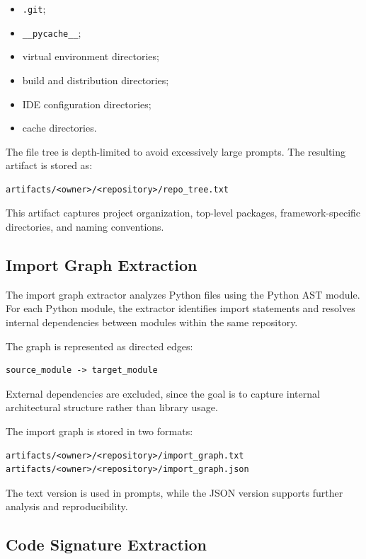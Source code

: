 \begin{itemize}
    \item \texttt{.git};
    \item \texttt{\_\_pycache\_\_};
    \item virtual environment directories;
    \item build and distribution directories;
    \item IDE configuration directories;
    \item cache directories.
\end{itemize}

The file tree is depth-limited to avoid excessively large prompts. The resulting artifact is stored as:

\begin{verbatim}
artifacts/<owner>/<repository>/repo_tree.txt
\end{verbatim}

This artifact captures project organization, top-level packages, framework-specific directories, and naming conventions.

\subsection{Import Graph Extraction}

The import graph extractor analyzes Python files using the Python AST module. For each Python module, the extractor identifies import statements and resolves internal dependencies between modules within the same repository.

The graph is represented as directed edges:

\begin{verbatim}
source_module -> target_module
\end{verbatim}

External dependencies are excluded, since the goal is to capture internal architectural structure rather than library usage.

The import graph is stored in two formats:

\begin{verbatim}
artifacts/<owner>/<repository>/import_graph.txt
artifacts/<owner>/<repository>/import_graph.json
\end{verbatim}

The text version is used in prompts, while the JSON version supports further analysis and reproducibility.

\subsection{Code Signature Extraction}

